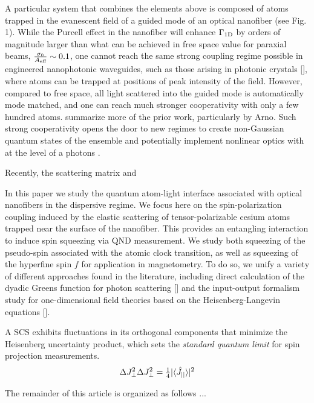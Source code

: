\documentclass[preprint,aps,pra,onecolumn]{revtex4-1} %
\newcommand{\oneD}{{\rm 1D}}
\newcommand{\change}[1]{{\color{RoyalBlue} #1}}
\begin{document}
A particular system that combines the elements above is composed of atoms trapped in the evanescent field of a guided mode of an optical nanofiber \cite{vetsch_nanofiber-based_2012, lacroute_state-insensitive_2012} (see Fig. 1).  While the Purcell effect in the nanofiber will enhance  $\Gamma_{\oneD}$ by orders of magnitude larger than what can be achieved in free space value for paraxial beams,  $\frac{\sigma_0}{A_{\text{eff}}} \sim 0.1$, one cannot reach the same strong coupling regime possible in engineered nanophotonic waveguides, such as those arising in photonic crystals [], where atoms can be trapped at positions of peak intensity of the field.  However, compared to free space, all light scattered into the guided mode is automatically mode matched, and one can reach much stronger cooperativity with only a few hundred atoms.  {\color{red}  summarize more of the prior work, particularly by Arno}.  Such strong cooperativity opens the door to new regimes to create non-Gaussian quantum states of the ensemble \cite{} and potentially implement nonlinear optics with at the level of a photons \cite{}.

Recently, the scattering matrix and \cite{le_kien_propagation_2014}

In this paper we study the quantum atom-light interface associated with optical nanofibers in the 
dispersive regime.  We focus here on the spin-polarization coupling induced by the elastic scattering of 
tensor-polarizable cesium atoms trapped near the surface of the nanofiber.  This provides an entangling 
interaction to induce spin squeezing via QND measurement.  We study both squeezing of the 
pseudo-spin associated with the atomic clock transition, as well as squeezing of the hyperfine spin $f$ 
for application in magnetometry.  To do so, we unify a variety of different approaches found in the 
literature, including direct calculation of the dyadic Greens function for photon scattering [] and the 
input-output formalism study for one-dimensional field theories based on the Heisenberg-Langevin 
equations [].

A SCS exhibits fluctuations in its orthogonal components that minimize the Heisenberg uncertainty product, which sets the \emph{standard quantum limit} for spin projection measurements.
	\begin{align}
		\Delta J_\perp^2 \Delta J_\perp^2 = \mbox{$\frac{1}{4}$} |\langle{\hat{J}_{||}}\rangle|^2
	\end{align}


\change{The remainder of this article is organized as follows ...}
\end{document}
